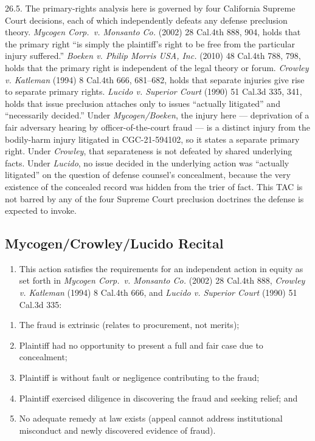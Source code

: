 26.5. The primary-rights analysis here is governed by four California Supreme Court decisions, each of which independently defeats any defense preclusion theory. \emph{Mycogen Corp.~v. Monsanto Co.} (2002) 28 Cal.4th 888, 904, holds that the primary right ``is simply the plaintiff's right to be free from the particular injury suffered.'' \emph{Boeken v. Philip Morris USA, Inc.} (2010) 48 Cal.4th 788, 798, holds that the primary right is independent of the legal theory or forum. \emph{Crowley v. Katleman} (1994) 8 Cal.4th 666, 681--682, holds that separate injuries give rise to separate primary rights. \emph{Lucido v. Superior Court} (1990) 51 Cal.3d 335, 341, holds that issue preclusion attaches only to issues ``actually litigated'' and ``necessarily decided.'' Under \emph{Mycogen/Boeken}, the injury here --- deprivation of a fair adversary hearing by officer-of-the-court fraud --- is a distinct injury from the bodily-harm injury litigated in CGC-21-594102, so it states a separate primary right. Under \emph{Crowley}, that separateness is not defeated by shared underlying facts. Under \emph{Lucido}, no issue decided in the underlying action was ``actually litigated'' on the question of defense counsel's concealment, because the very existence of the concealed record was hidden from the trier of fact. This TAC is not barred by any of the four Supreme Court preclusion doctrines the defense is expected to invoke.

\subsection{Mycogen/Crowley/Lucido Recital}\label{mycogencrowleylucido-recital}

\begin{enumerate}
\def\labelenumi{\arabic{enumi}.}
\setcounter{enumi}{26}
\tightlist
\item
  This action satisfies the requirements for an independent action in equity as set forth in \emph{Mycogen Corp.~v. Monsanto Co.} (2002) 28 Cal.4th 888, \emph{Crowley v. Katleman} (1994) 8 Cal.4th 666, and \emph{Lucido v. Superior Court} (1990) 51 Cal.3d 335:
\end{enumerate}

\begin{enumerate}
\def\labelenumi{(\alph{enumi})}
\item
  The fraud is extrinsic (relates to procurement, not merits);
\item
  Plaintiff had no opportunity to present a full and fair case due to concealment;
\item
  Plaintiff is without fault or negligence contributing to the fraud;
\item
  Plaintiff exercised diligence in discovering the fraud and seeking relief; and
\item
  No adequate remedy at law exists (appeal cannot address institutional misconduct and newly discovered evidence of fraud).
\end{enumerate}

